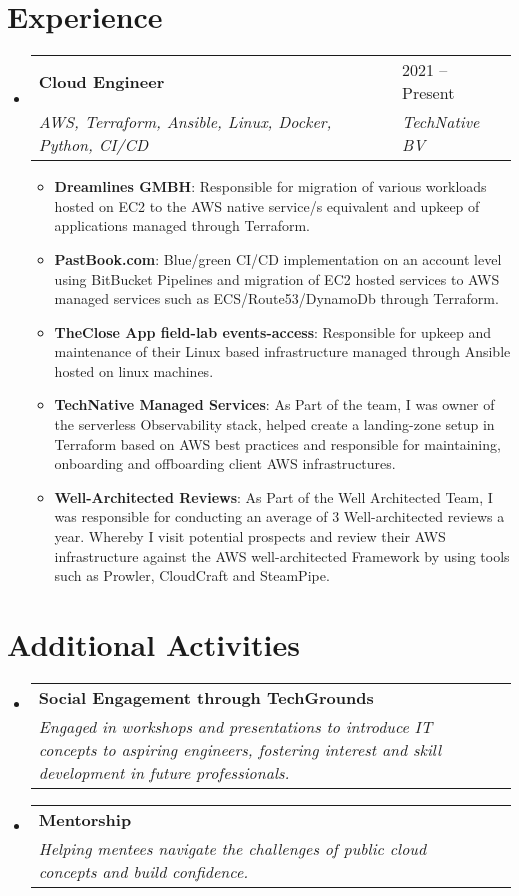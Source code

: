 \documentclass[letterpaper,11pt]{article}
\makeatletter
\newcommand{\resumeItem}[1]{
  \item\small{
    {#1 \vspace{-2pt}}
  }
}
\newcommand{\resumeSubheading}[4]{
  \vspace{-2pt}\item
    \begin{tabular*}{\textwidth}{@{\extracolsep{\fill}}p{0.85\textwidth} p{0.20\textwidth}@{}}
      \textbf{#1} & #2 \\
      \textit{\small#3} & \textit{\small #4} \\
    \end{tabular*}\vspace{-7pt}
}
\newcommand{\resumeSubHeadingListStart}{\begin{itemize}[leftmargin=0.15in, label={}]}
\newcommand{\resumeSubHeadingListEnd}{\end{itemize}}
\newcommand{\resumeItemListStart}{\begin{itemize}}
\newcommand{\resumeItemListEnd}{\end{itemize}\vspace{-5pt}}
\makeatother
\begin{document}
\vspace{0.5cm}
\section{Experience}
  \resumeSubHeadingListStart

    \resumeSubheading
      {Cloud Engineer}{2021 -- Present}
      {AWS, Terraform, Ansible, Linux, Docker, Python, CI/CD}{TechNative BV}
      \resumeItemListStart
        \resumeItem{\textbf{Dreamlines GMBH}: Responsible for migration of various workloads hosted on EC2 to the AWS native service/s equivalent and upkeep of applications managed through Terraform.}
        \resumeItem{\textbf{PastBook.com}: Blue/green CI/CD implementation on an account level using BitBucket Pipelines and migration of EC2 hosted services to AWS managed services such as ECS/Route53/DynamoDb through Terraform.}
        \resumeItem{\textbf{TheClose App field-lab events-access}: Responsible for upkeep and maintenance of their Linux based infrastructure managed through Ansible hosted on linux machines.}
        \resumeItem{\textbf{TechNative Managed Services}: As Part of the team, I was owner of the serverless Observability stack, helped create a landing-zone setup in Terraform based on AWS best practices and responsible for maintaining, onboarding and offboarding client AWS infrastructures.}
        \resumeItem{\textbf{Well-Architected Reviews}: As Part of the Well Architected Team, I was responsible for conducting an average of 3 Well-architected reviews a year. Whereby I visit potential prospects and review their AWS infrastructure against the AWS well-architected Framework by using tools such as Prowler, CloudCraft and SteamPipe.}
      \resumeItemListEnd
  \resumeSubHeadingListEnd

\vspace{0.5cm}
\section{Additional Activities}
  \resumeSubHeadingListStart
    \resumeSubheading
      {Social Engagement through TechGrounds}{}
      {Engaged in workshops and presentations to introduce IT concepts to aspiring engineers, fostering interest and skill development in future professionals.}{}
    \resumeSubheading
      {Mentorship}{}
      {Helping mentees navigate the challenges of public cloud concepts and build confidence.}{}
  \resumeSubHeadingListEnd
\end{document}
